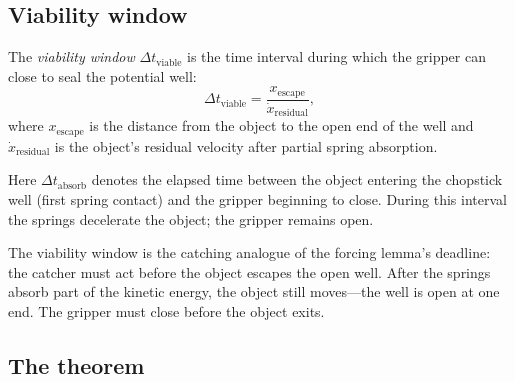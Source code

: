 \subsection{Viability window}

\begin{definition}
\label{def:c-viability-window}
The \emph{viability window} $\Delta t_{\mathrm{viable}}$ is the
time interval during which the gripper can close to seal the
potential well:
\[
  \Delta t_{\mathrm{viable}}
  = \frac{x_{\mathrm{escape}}}{\dot{x}_{\mathrm{residual}}},
\]
where $x_{\mathrm{escape}}$ is the distance from the object to the
open end of the well and $\dot{x}_{\mathrm{residual}}$ is the
object's residual velocity after partial spring absorption.
\end{definition}

Here $\Delta t_{\mathrm{absorb}}$ denotes the elapsed time
between the object entering the chopstick well (first spring
contact) and the gripper beginning to close.  During this
interval the springs decelerate the object; the gripper
remains open.

The viability window is the catching analogue of the forcing
lemma's deadline: the catcher must act before the object escapes
the open well.  After the springs absorb part of the kinetic
energy, the object still moves---the well is open at one end.
The gripper must close before the object exits.

\subsection{The theorem}

